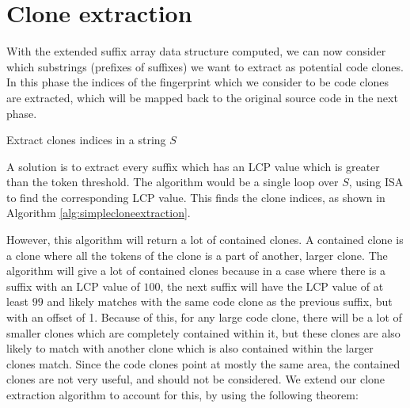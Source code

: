 \section{Clone extraction}

With the extended suffix array data structure computed, we can now consider which
substrings (prefixes of suffixes) we want to extract as potential code clones. In this
phase the indices of the fingerprint which we consider to be code clones are extracted,
which will be mapped back to the original source code in the next phase.

\begin{algorithm}[t]
  \SetAlgoLined\DontPrintSemicolon

  \vspace{0.5cm}
  \caption{Extract clones indices in a string $S$}
  \label{alg:simplecloneextraction}
\end{algorithm}

A solution is to extract every suffix which has an LCP value which is greater than the
token threshold. The algorithm would be a single loop over $S$, using ISA to find the
corresponding LCP value. This finds the clone indices, as shown in Algorithm
\ref{alg:simplecloneextraction}.


However, this algorithm will return a lot of contained clones. A contained clone is a
clone where all the tokens of the clone is a part of another, larger clone. The algorithm
will give a lot of contained clones because in a case where there is a suffix with an LCP
value of $100$, the next suffix will have the LCP value of at least $99$ and likely
matches with the same code clone as the previous suffix, but with an offset of 1. Because
of this, for any large code clone, there will be a lot of smaller clones which are
completely contained within it, but these clones are also likely to match with another
clone which is also contained within the larger clones match. Since the code clones point
at mostly the same area, the contained clones are not very useful, and should not be
considered. We extend our clone extraction algorithm to account for this, by using the
following theorem:

